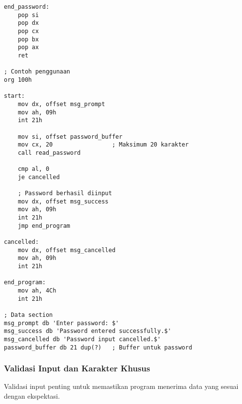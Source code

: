 \documentclass[../main.tex]{subfiles}
\begin{document}
\begin{lstlisting}[language={[x86masm]Assembler}, caption=Input Password tanpa Echo, label={lst:password-input}]
end_password:
    pop si
    pop dx
    pop cx
    pop bx
    pop ax
    ret

; Contoh penggunaan
org 100h

start:
    mov dx, offset msg_prompt
    mov ah, 09h
    int 21h
    
    mov si, offset password_buffer
    mov cx, 20                 ; Maksimum 20 karakter
    call read_password
    
    cmp al, 0
    je cancelled
    
    ; Password berhasil diinput
    mov dx, offset msg_success
    mov ah, 09h
    int 21h
    jmp end_program
    
cancelled:
    mov dx, offset msg_cancelled
    mov ah, 09h
    int 21h
    
end_program:
    mov ah, 4Ch
    int 21h

; Data section
msg_prompt db 'Enter password: $'
msg_success db 'Password entered successfully.$'
msg_cancelled db 'Password input cancelled.$'
password_buffer db 21 dup(?)   ; Buffer untuk password
\end{lstlisting}

            \subsubsection{Validasi Input dan Karakter Khusus}
Validasi input penting untuk memastikan program menerima data yang sesuai dengan ekspektasi.
\end{document}
